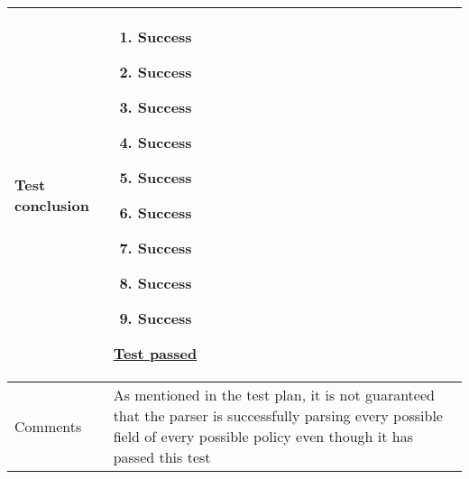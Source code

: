 \begin{center}
\begin{longtable}{ | p{4cm} | p{10cm} | }
			Test conclusion & 	\begin{enumerate}
							\item Success
							\item Success
							\item Success
							\item Success
							\item Success
							\item Success
							\item Success
							\item Success
							\item Success
						\end{enumerate}
						\underline{Test passed} \\  [3pt] \hline
			Comments & As mentioned in the test plan, it is not guaranteed that the parser is successfully parsing every possible field of every possible policy even though it has passed this test
					\\ [3pt] \hline
		\end{longtable}
	\end{center}

